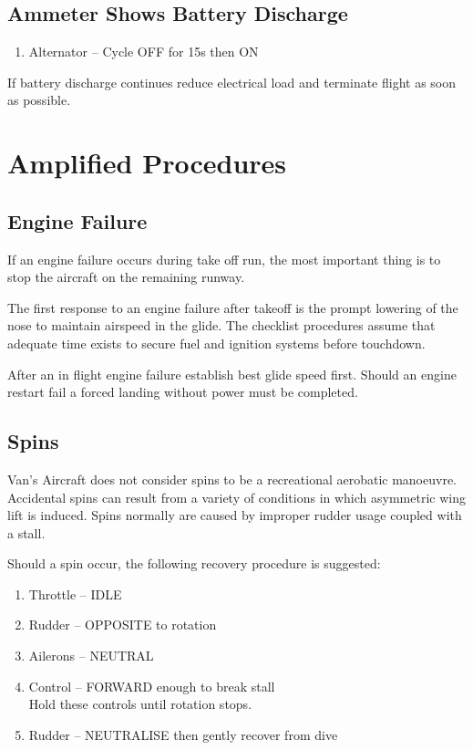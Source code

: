 \subsection{Ammeter Shows Battery Discharge}
\begin{enumerate}[(1)]
  \item Alternator -- Cycle OFF for 15s then ON
\end{enumerate}
If battery discharge continues reduce electrical load and terminate flight as soon as possible.

\section{Amplified Procedures}
\subsection{Engine Failure}
If an engine failure occurs during take off run, the most important thing is to stop the aircraft on the remaining runway.

The first response to an engine failure after takeoff is the prompt lowering of the nose to maintain airspeed in the glide.   The checklist procedures assume that adequate time exists to secure fuel and ignition systems before touchdown.

After an in flight engine failure establish best glide speed first.  Should an engine restart fail a forced landing without power must be completed.

\subsection{Spins}
Van's Aircraft does not consider spins to be a recreational aerobatic manoeuvre.  Accidental spins can result from a variety of conditions in which asymmetric wing lift is induced.  Spins normally are caused by improper rudder usage coupled with a stall. 

Should a spin occur, the following recovery procedure is suggested:
\begin{enumerate}[(1)]
  \item Throttle -- IDLE
  \item Rudder -- OPPOSITE to rotation
  \item Ailerons -- NEUTRAL
  \item Control -- FORWARD enough to break stall\\
Hold these controls until rotation stops.
  \item Rudder -- NEUTRALISE then gently recover from dive
  \end{enumerate}